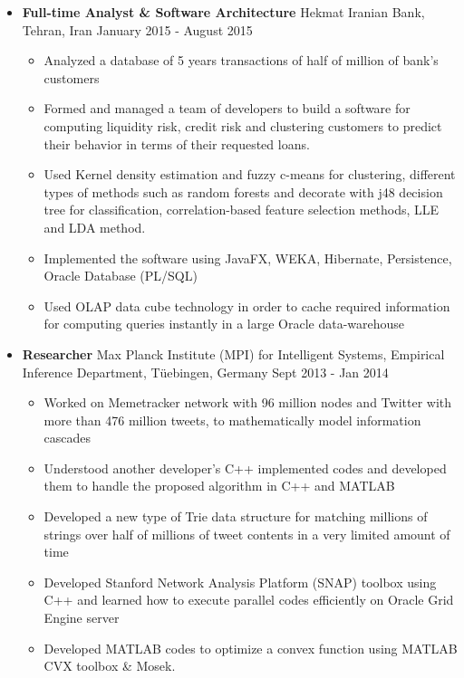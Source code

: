 \documentclass[letter]{res}
\begin{document}
\begin{resume}
\begin{itemize}[leftmargin=-.1in]
\item \textbf{Full-time Analyst \& Software Architecture} \newline
Hekmat Iranian Bank, Tehran, Iran \hfill January 2015 - August 2015\\
  \vspace{-4mm}
  \iflong
    \begin{itemize}
        \item Analyzed a database of 5 years transactions of half of million of bank's customers
        \item Formed and managed a team of developers to build a software for computing liquidity risk, credit risk and clustering customers to predict their behavior in terms of their requested loans. 
        \item Used Kernel density estimation and fuzzy c-means for clustering, different types of methods such as random forests and decorate with j48 decision tree for classification, correlation-based feature selection methods, LLE and LDA method.
        \item Implemented the software using JavaFX, WEKA, Hibernate, Persistence, Oracle Database (PL/SQL)
        \item Used OLAP data cube technology in order to cache required information for computing queries instantly in a large Oracle data-warehouse
    \end{itemize}
  \fi
  
\item \textbf{Researcher} \newline
Max Planck Institute (MPI) for Intelligent Systems, Empirical Inference Department, Tüebingen, Germany \hfill {\footnotesize Sept 2013 - Jan 2014}\\
    \vspace{-4mm}
    \iflong
      \begin{itemize}
          \item Worked on Memetracker network with 96 million nodes and Twitter with more than 476 million tweets, to mathematically model information cascades
          \item Understood another developer's C++ implemented codes and developed them to handle the proposed algorithm in C++ and MATLAB
          \item Developed a new type of Trie data structure for matching millions of strings over half of millions of tweet contents in a very limited amount of time
          \item Developed Stanford Network Analysis Platform (SNAP) toolbox using C++ and learned how to execute parallel codes efficiently on Oracle Grid Engine server
          \item Developed MATLAB codes to optimize a convex function using MATLAB CVX toolbox \& Mosek.
      \end{itemize}
    \fi
  

\end{itemize}
\end{resume}
\end{document}
